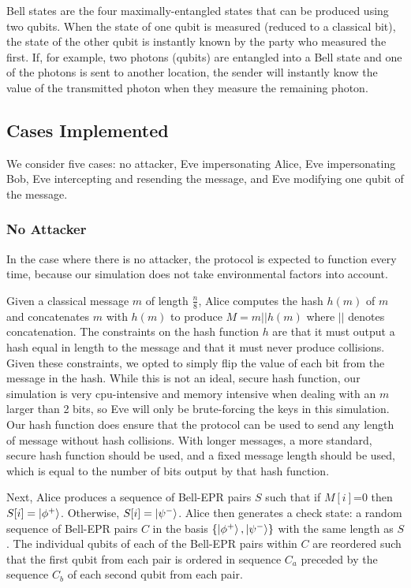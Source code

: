 \documentclass[conference]{IEEEtran}
\begin{document}
Bell states are the four maximally-entangled states that can be produced
using two qubits. When the state of one qubit is measured (reduced
to a classical bit), the state of the other qubit is instantly known
by the party who measured the first. If, for example, two photons (qubits)
are entangled into a Bell state and one of the photons is sent to
another location, the sender will instantly know the value of the
transmitted photon when they measure the remaining photon. 

\subsection{Cases Implemented}

We consider five cases: no attacker, Eve impersonating Alice, Eve
impersonating Bob, Eve intercepting and resending the message, and Eve
modifying one qubit of the message.

\subsubsection{No Attacker}

In the case where there is no attacker, the protocol is expected
to function every time, because our simulation does not take environmental
factors into account.

Given a classical message $m$ of length $\frac{n}{8}$, Alice computes
the hash $h(m)$ of $m$ and concatenates $m$ with $h(m)$ to produce $M=m||h(m)$ where
$||$ denotes concatenation. The constraints
on the hash function $h$ are that it must output a hash equal in
length to the message and that it must never produce collisions. Given
these constraints, we opted to simply flip the value of each
bit from the message in the hash. While this is not an ideal, secure hash function,
our simulation is very cpu-intensive and memory intensive when dealing with an $m$ larger
than 2 bits, so Eve will only be brute-forcing the keys in this simulation.
Our hash function does ensure that the protocol can be used to send any
length of message without hash collisions.
With longer messages, a more standard, secure hash function should be used, and a fixed message length
should be used, which is equal to the number of bits output by that hash function.

Next, Alice produces a sequence of Bell-EPR pairs $S$ such that if $M[i]$=0 then $S[i]=\ket{\phi^{+}} $.
Otherwise, $S[i]=\ket{\psi^{-}} $. Alice then generates
a check state: a random sequence of Bell-EPR pairs $C$ in the basis $\left\{ \ket{\phi^{+}} ,\ket{\psi^{-}} \right\} $
with the same length as $S$. The individual qubits of each of the Bell-EPR pairs within $C$ are reordered such that
the first qubit from each pair is ordered in sequence $C_{a}$ preceded by the sequence $C_{b}$ of each second
qubit from each pair.
\end{document}
